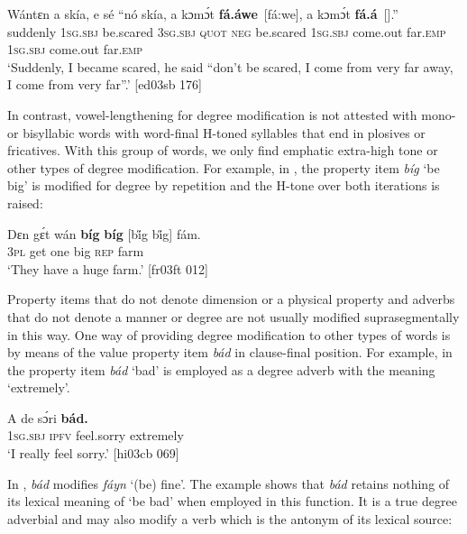 \ea%
    \label{ex:key:895}
    \gll Wántɛn  a    skía,      e    sé  “nó  skía,      a    kɔmɔ́t
\textbf{fá.áwe}~[fá:we],  a    kɔmɔ́t    \textbf{fá.á}~[].”\\
suddenly  \textsc{1sg.sbj}  be.scared  \textsc{3sg.sbj}  \textsc{quot}  \phantom{“}\textsc{neg}  be.scared  \textsc{1sg.sbj}  come.out
far.\textsc{emp}      \textsc{1sg.sbj}  come.out  far.\textsc{emp}\\

\glt ‘Suddenly, I became scared, he said “don’t be scared, I come from very far away, 
I come from very far”.’ [ed03sb 176]
\z

In contrast, vowel-lengthening for degree modification is not attested with mono- or bisyllabic words with word-final H-toned syllables that end in plosives or fricatives. With this group of words, we only find emphatic extra-high tone or other types of degree modification. For example, in , the property item \textit{bíg} ‘be big’ is modified for degree by repetition and the H-tone over both iterations is raised: 


\ea%
    \label{ex:key:896}
    \gll Dɛn  gɛ́t  wán  \textbf{bíg}  \textbf{bíg} [b\H{i}g b\H{i}g] fám.\\
\textsc{3pl}  get  one  big  \textsc{rep} {} {}     farm\\

\glt ‘They have a huge farm.’ [fr03ft 012]
\z

Property items that do not denote dimension or a physical property and adverbs that do not denote a manner or degree are not usually modified suprasegmentally in this way. One way of providing degree modification to other types of words is by means of the value property item \textit{bád} in clause-final position. For example, in  the property item \textit{bád} ‘bad’ is employed as a degree adverb with the meaning ‘extremely’. 


\ea%
    \label{ex:key:897}
    \gll A    de  sɔ́ri      \textbf{bád.}\\
\textsc{1sg.sbj}  \textsc{ipfv}  feel.sorry  extremely\\

\glt ‘I really feel sorry.’ [hi03cb 069]
\z

In , \textit{bád} modifies \textit{fáyn} ‘(be) fine’. The example shows that \textit{bád} retains nothing of its lexical meaning of ‘be bad’ when employed in this function. It is a true degree adverbial and may also modify a verb which is the antonym of its lexical source:


